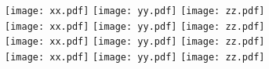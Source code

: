 \documentclass[12pt,a4paper]{article}
\begin{document}
\pagestyle{empty}
\noindent
\texttt{[image: xx.pdf]}\hspace{.3in}
\texttt{[image: yy.pdf]}\hspace{.3in} 
\texttt{[image: zz.pdf]}\\[.5in]
\texttt{[image: xx.pdf]}\hspace{.3in}
\texttt{[image: yy.pdf]} \hspace{.3in}
\texttt{[image: zz.pdf]} \\[.5in]
\texttt{[image: xx.pdf]}\hspace{.3in}
\texttt{[image: yy.pdf]} \hspace{.3in}
\texttt{[image: zz.pdf]}\\[.5in]
\texttt{[image: xx.pdf]}\hspace{.3in}
\texttt{[image: yy.pdf]} \hspace{.3in}
\texttt{[image: zz.pdf]} 
\end{document}
